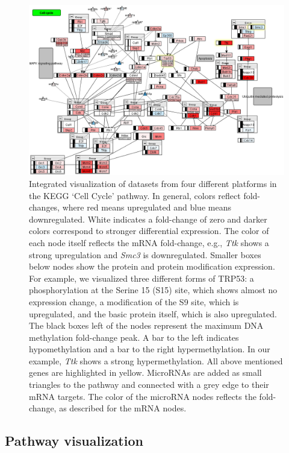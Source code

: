 \documentclass{bioinfo}
\begin{document}
\begin{figure}
\centering
\includegraphics[width=.675\textwidth]{figures/mmu04110_highlight.png}
\caption{Integrated visualization of datasets from four different platforms in the KEGG `Cell Cycle' pathway.
In general, colors reflect fold-changes, where red means upregulated and blue means
downregulated. White indicates a fold-change of zero and darker colors correspond to stronger
differential expression. The color of each node itself reflects the mRNA fold-change, e.g., \emph{Ttk}
shows a strong upregulation and \emph{Smc3} is downregulated. Smaller boxes below nodes show the protein
and protein modification expression. For example, we visualized three different forms of TRP53: a
phosphorylation at the Serine 15 (S15) site, which shows almost no expression change, a modification
of the S9 site, which is upregulated, and the basic protein itself, which is also upregulated. The
black boxes left of the nodes represent the maximum DNA methylation fold-change peak. A bar to the
left indicates hypomethylation and a bar to the right hypermethylation. In our example, \emph{Ttk} shows
a strong hypermethylation.
All above mentioned genes are highlighted in yellow.
MicroRNAs are added as small triangles to the pathway and connected with
a grey edge to their mRNA targets. The color of the microRNA nodes reflects the fold-change, as
described for the mRNA nodes.}
\label{fig:cellcycle}
\end{figure}

\subsection{Pathway visualization}
\end{document}
